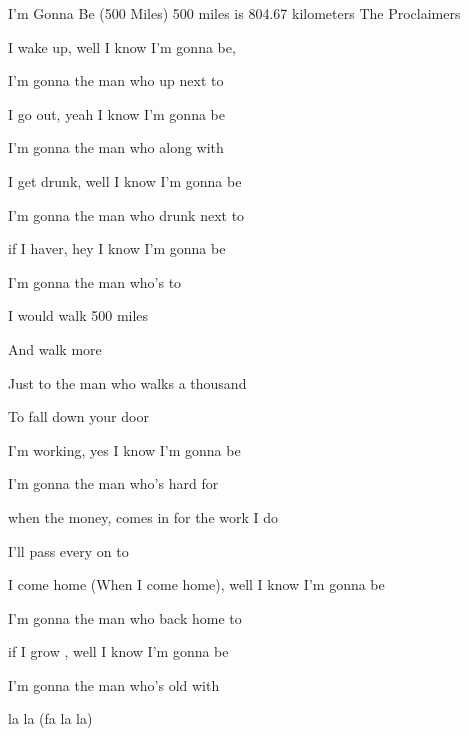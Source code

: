 \begin{SBSong}{I'm Gonna Be (500 Miles)}
    {500 miles is 804.67 kilometers}
    {The Proclaimers}
  \begin{SBVerse}
     I wake up, well I know I'm gonna be,

    I'm gonna  the man who  up next to 

     I go out, yeah I know I'm gonna be

    I'm gonna  the man who  along with 

     I get drunk, well I know I'm gonna be

    I'm gonna  the man who  drunk next to 

     if I haver, hey I know I'm gonna be

    I'm gonna  the man who's  to 
  \end{SBVerse}
  \begin{SBChorus}
     I would walk 500 miles

    And  walk  more

    Just to  the man who walks a thousand 

    To fall down  your door
  \end{SBChorus}
  \begin{SBVerse}
     I'm working, yes I know I'm gonna be

    I'm gonna  the man who's  hard for 

     when the money, comes in for the work I do

    I'll pass  every  on to 

     I come home (When I come home), well I know I'm gonna be

    I'm gonna  the man who  back home to 

     if I grow , well I know I'm gonna be

	I'm gonna  the man who's  old with 
  \end{SBVerse}
  \CBPageBrk
  \begin{SBChorus*}
	 la la (fa la la)
	

\end{SBChorus*}
\end{SBSong}
